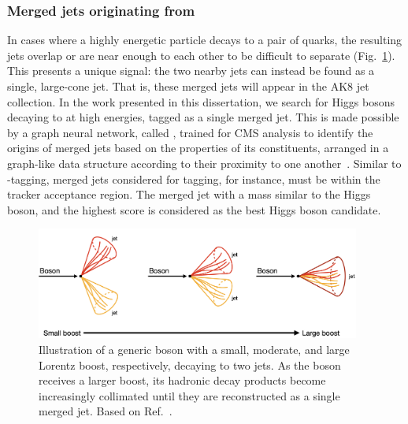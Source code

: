 \subsubsection{Merged jets originating from \Htobb}
In cases where a highly energetic particle decays to a pair of quarks, the resulting jets overlap or are near enough to each other to be difficult to separate (Fig.~\ref{fig:resolved_to_merged}). 
This presents a unique signal: the two nearby jets can instead be found as a single, large-cone jet. 
That is, these merged jets will appear in the AK8 jet collection. 
In the work presented in this dissertation, we search for Higgs bosons decaying to \bbbar at high energies, tagged as a single merged jet. 
This is made possible by a graph neural network, called \ParticleNet, trained for CMS analysis to identify the origins of merged jets based on the properties of its constituents, arranged in a graph-like data structure according to their proximity to one another~\cite{Qu:2019gqs}. 
Similar to \Pb-tagging, merged jets considered for \Xtobb tagging, for instance, must be within the tracker acceptance region. 
The merged jet with a mass similar to the Higgs boson, and the highest \ParticleNet \Xtobb score is considered as the best Higgs boson candidate.

\begin{figure}[htb]
    \centering
    \includegraphics[width=0.95\textwidth]{fig/resolved_to_merged.png}
    \caption[Illustration of a generic boson with a small, moderate, and large Lorentz boost, respectively, decaying to two jets.]{
        Illustration of a generic boson with a small, moderate, and large Lorentz boost, respectively, decaying to two jets.
        As the boson receives a larger boost, its hadronic decay products become increasingly collimated until they are reconstructed as a single merged jet. 
        Based on Ref.~\cite{Collaboration:2809446}.
    }
    \label{fig:resolved_to_merged}
\end{figure}

